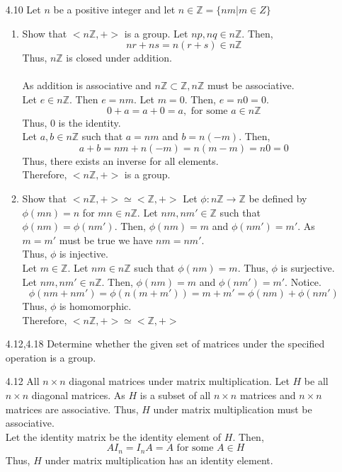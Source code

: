 \documentclass[12pt]{article}
\newcommand{\Z}{\mathds{Z}}
\begin{document}
\begin{enumerate}
			\item[4.10] Let $n$ be a positive integer and let $n\in\Z = \{nm | m\in Z\}$
			\begin{enumerate}
				\item Show that $ <n\Z,+> $ is a group.
				Let $ np, nq \in n\Z $. Then,
					\[nr+ns=n(r+s)\in n\Z\]
				Thus, $ n\Z $ is closed under addition.\\
				\\
				As addition is associative and $ n\Z \subset \Z, n\Z $ must be associative.\\
				Let $ e\in n\Z $. Then $ e=nm$. Let $ m=0 $. Then, $ e=n0=0 $.
					\[0+a=a+0=a, \text{ for some } a\in n\Z\]
				Thus, 0 is the identity.\\
				Let $ a,b\in n\Z $ such that $ a=nm $ and $ b=n(-m) $. Then,
				\[a+b=nm+n(-m)=n(m-m)=n0=0 \]
				Thus, there exists an inverse for all elements.\\
				Therefore, $ <n\Z,+> $ is a group.
				\item Show that $ <n\Z,+> \simeq <\Z,+>$
				Let $ \phi : n\Z \rightarrow \Z $ be defined by $ \phi(mn)=n $ for $ mn\in n\Z $.
				Let $ nm,nm'\in \Z $ such that $ \phi(nm)=\phi(nm') $. Then, $ \phi(nm)=m $ and $ \phi(nm') =m' $. As $ m = m' $ must be true we have $ nm=nm' $. \\
				Thus, $ \phi $ is injective.\\
				Let $ m\in\Z $. Let $nm\in n\Z  $ such that $ \phi(nm)=m $.
				Thus, $ \phi $ is surjective.\\
				Let $ nm,nm'\in n\Z $. Then, $ \phi(nm)=m $ and $ \phi(nm') =m' $. Notice.
				\[\phi(nm+nm')=\phi(n(m+m'))=m+m'=\phi(nm)+\phi(nm') \]
				Thus, $ \phi $ is homomorphic.\\
				Therefore, $ <n\Z,+> \simeq <\Z,+>$
			\end{enumerate}
			\item[4.12,4.18] Determine whether the given set of matrices under the specified operation is a group.
			\item[4.12] All $n \times n$ diagonal matrices under matrix multiplication.
			Let $ H $ be all $ n \times n $ diagonal matrices.  As $ H $ is a subset of all $ n\times n $ matrices and $ n \times n $ matrices are associative. Thus, $ H $ under matrix multiplication must be associative.\\
			Let the identity matrix be the identity element of $ H $. Then,
			\[AI_n=I_nA=A \text{ for some } A\in H\]
			Thus, $ H $ under matrix multiplication has an identity element.\\

\end{enumerate}
\end{document}
